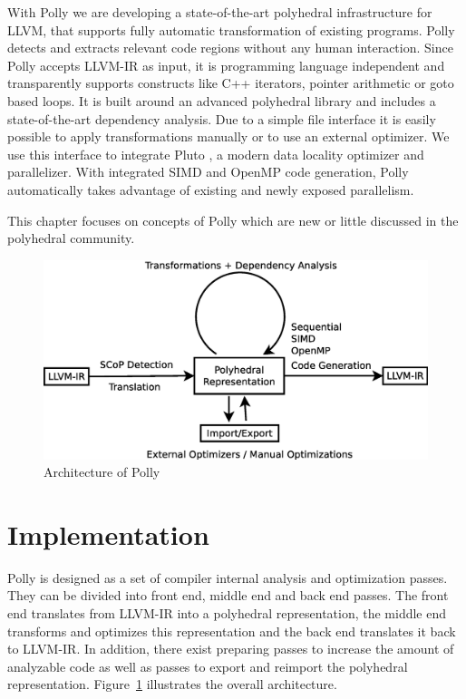 With Polly we are developing a state-of-the-art polyhedral infrastructure for
LLVM, that supports fully automatic transformation of existing programs. Polly
detects and extracts relevant code regions without any human interaction. Since
Polly accepts LLVM-IR as input, it is programming language independent and
transparently supports constructs like C++ iterators, pointer arithmetic or
goto based loops. It is built around an advanced polyhedral library and includes a state-of-the-art
dependency analysis. Due to a simple file interface it is easily possible to
apply transformations manually or to use an external optimizer. We use this
interface to integrate Pluto \cite{pluto}, a modern data locality
optimizer and parallelizer. With integrated SIMD and OpenMP code
generation, Polly automatically takes advantage of existing and newly exposed
parallelism.

This chapter focuses on concepts of Polly which are new or little discussed in the polyhedral community.

\begin{figure}
  \includegraphics[width=1\textwidth]{images/architecture.eps}
  \caption{Architecture of Polly}
  \label{fig:arch}
\end{figure}

\section{Implementation}

Polly is designed as a set of compiler internal analysis and optimization
passes. They can be divided into front end, middle end and back end passes. The
front end translates from LLVM-IR into a polyhedral representation, the middle
end transforms and optimizes this representation and the back end translates it
back to LLVM-IR. In addition, there exist preparing passes to increase the
amount of analyzable code as well as passes to export and reimport the polyhedral
representation.  Figure~\ref{fig:arch} illustrates the overall
architecture.

